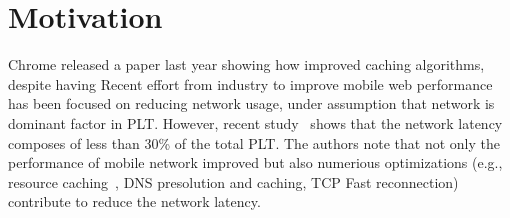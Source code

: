 \section{Motivation}
\label{sec:motivation}

Chrome released a paper last year showing how improved caching algorithms, despite having 
Recent effort from industry to improve mobile web performance has been
focused on reducing network usage, under assumption that network is
dominant factor in PLT. However, recent study~\cite{njait2016www}
shows that the network latency composes of less than 30\% of the total
PLT. The authors note that not only the performance of mobile network
improved but also numerious optimizations (e.g., resource
caching~\cite{vesuna2016caching}, DNS presolution and caching, TCP
Fast reconnection) contribute to reduce the network latency.



